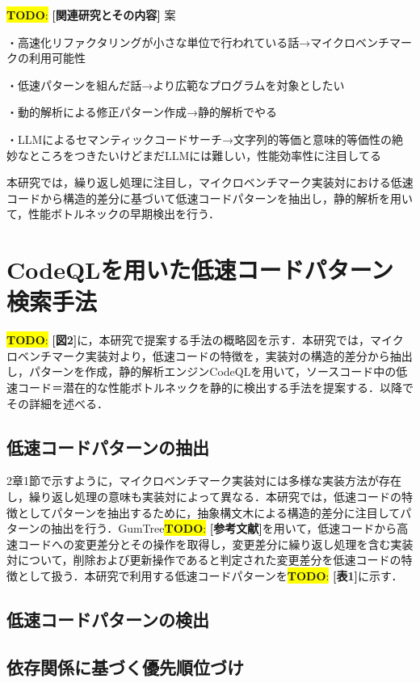\documentclass[submit,techrep,noauthor]{ipsj}
\newcommand{\todo}[1]{\colorbox{yellow}{{\bf TODO}:}{\color{red} {\textbf{[#1]}}}}
\begin{document}
\todo{関連研究とその内容}
案

・高速化リファクタリングが小さな単位で行われている話→マイクロベンチマークの利用可能性

・低速パターンを組んだ話→より広範なプログラムを対象としたい

・動的解析による修正パターン作成→静的解析でやる

・LLMによるセマンティックコードサーチ→文字列的等価と意味的等価性の絶妙なところをつきたいけどまだLLMには難しい，性能効率性に注目してる

本研究では，繰り返し処理に注目し，マイクロベンチマーク実装対における低速コードから構造的差分に基づいて低速コードパターンを抽出し，静的解析を用いて，性能ボトルネックの早期検出を行う．


\section{CodeQLを用いた低速コードパターン検索手法}
\label{sec3:format}

\todo{図2}に，本研究で提案する手法の概略図を示す．本研究では，マイクロベンチマーク実装対より，低速コードの特徴を，実装対の構造的差分から抽出し，パターンを作成，静的解析エンジンCodeQLを用いて，ソースコード中の低速コード＝潜在的な性能ボトルネックを静的に検出する手法を提案する．以降でその詳細を述べる．

\subsection{低速コードパターンの抽出}

2章1節で示すように，マイクロベンチマーク実装対には多様な実装方法が存在し，繰り返し処理の意味も実装対によって異なる．本研究では，低速コードの特徴としてパターンを抽出するために，抽象構文木による構造的差分に注目してパターンの抽出を行う．GumTree\todo{参考文献}を用いて，低速コードから高速コードへの変更差分とその操作を取得し，変更差分に繰り返し処理を含む実装対について，削除および更新操作であると判定された変更差分を低速コードの特徴として扱う．本研究で利用する低速コードパターンを\todo{表1}に示す．

\subsection{低速コードパターンの検出}

\subsection{依存関係に基づく優先順位づけ}
\end{document}
